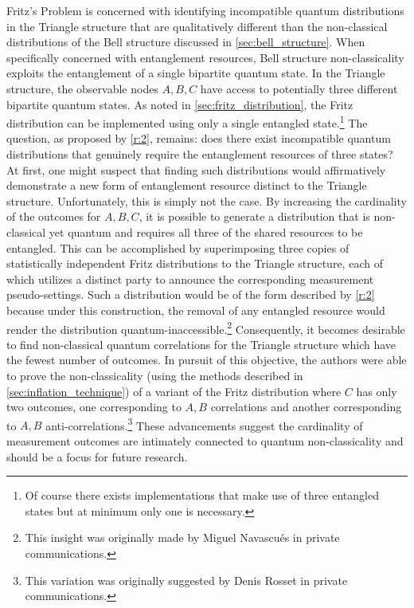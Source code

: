 \documentclass[aps, 10pt, english, twoside, pra, nofootinbib, tightenlines, longbibliography, superscriptaddress]{revtex4-1}
\begin{document}
    Fritz's Problem is concerned with identifying incompatible quantum distributions in the Triangle structure that are qualitatively different than the non-classical distributions of the Bell structure discussed in \cref{sec:bell_structure}. When specifically concerned with entanglement resources, Bell structure non-classicality exploits the entanglement of a single bipartite quantum state. In the Triangle structure, the observable nodes $A,B,C$ have access to potentially three different bipartite quantum states. As noted in \cref{sec:fritz_distribution}, the Fritz distribution can be implemented using only a single entangled state.\footnote{Of course there exists implementations that make use of three entangled states but at minimum only one is necessary.} The question, as proposed by \ref{r:2}, remains: does there exist incompatible quantum distributions that genuinely require the entanglement resources of three states? At first, one might suspect that finding such distributions would affirmatively demonstrate a new form of entanglement resource distinct to the Triangle structure. Unfortunately, this is simply not the case. By increasing the cardinality of the outcomes for $A, B, C$, it is possible to generate a distribution that is non-classical yet quantum and requires all three of the shared resources to be entangled. This can be accomplished by superimposing three copies of statistically independent Fritz distributions to the Triangle structure, each of which utilizes a distinct party to announce the corresponding measurement pseudo-settings. Such a distribution would be of the form described by \ref{r:2} because under this construction, the removal of any entangled resource would render the distribution quantum-inaccessible.\footnote{This insight was originally made by Miguel Navascués in private communications.} Consequently, it becomes desirable to find non-classical quantum correlations for the Triangle structure which have the fewest number of outcomes. In pursuit of this objective, the authors were able to prove the non-classicality (using the methods described in \cref{sec:inflation_technique}) of a variant of the Fritz distribution where $C$ has only two outcomes, one corresponding to $A, B$ correlations and another corresponding to $A, B$ anti-correlations.\footnote{This variation was originally suggested by Denis Rosset in private communications.} These advancements suggest the cardinality of measurement outcomes are intimately connected to quantum non-classicality and should be a focus for future research.
\end{document}
